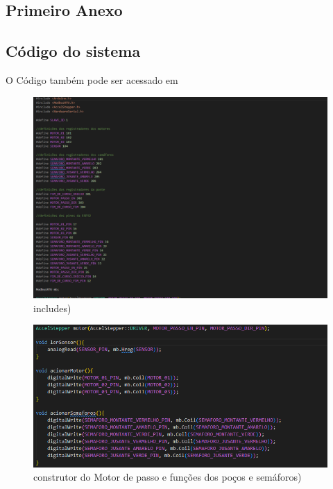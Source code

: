 \begin{anexosenv}

\partanexos

\chapter{Primeiro Anexo}

\section{Código do sistema}

O Código também pode ser acessado em

\begin{figure}[h]
	\centering
	\label{fig:codigo_pt01}
		\includegraphics[keepaspectratio=true,scale=0.6]{figuras/codigo_pt1.png}
	\caption{includes)}
\end{figure}

\begin{figure}[h]
	\centering
	\label{fig:codigo_pt02}
		\includegraphics[keepaspectratio=true,scale=0.6]{figuras/codigo_pt2.png}
	\caption{construtor do Motor de passo e funções dos poços e semáforos)}
\end{figure}


\end{anexosenv}
